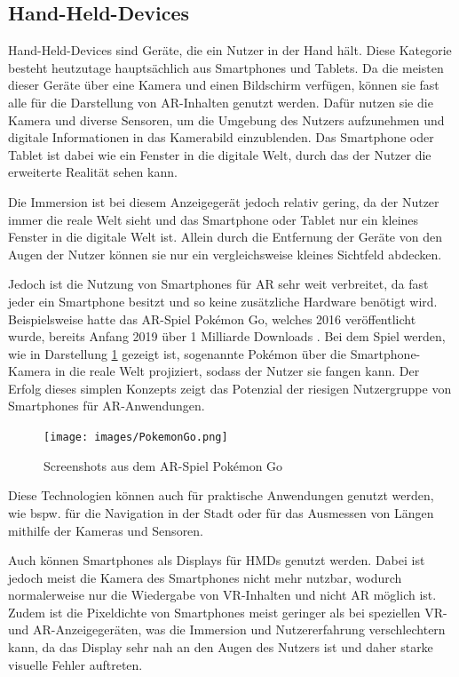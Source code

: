   \subsection{Hand-Held-Devices}

  Hand-Held-Devices sind Geräte, die ein Nutzer in der Hand hält.
  Diese Kategorie besteht heutzutage hauptsächlich aus Smartphones und Tablets.
  Da die meisten dieser Geräte über eine Kamera und einen Bildschirm verfügen, können sie fast alle für die Darstellung von AR-Inhalten genutzt werden.
  Dafür nutzen sie die Kamera und diverse Sensoren, um die Umgebung des Nutzers aufzunehmen und digitale Informationen in das Kamerabild einzublenden.
  Das Smartphone oder Tablet ist dabei wie ein Fenster in die digitale Welt, durch das der Nutzer die erweiterte Realität sehen kann.

  Die Immersion ist bei diesem Anzeigegerät jedoch relativ gering, da der Nutzer immer die reale Welt sieht und das Smartphone oder Tablet nur ein kleines Fenster in die digitale Welt ist.
  Allein durch die Entfernung der Geräte von den Augen der Nutzer können sie nur ein vergleichsweise kleines Sichtfeld abdecken.

  Jedoch ist die Nutzung von Smartphones für AR sehr weit verbreitet, da fast jeder ein Smartphone besitzt und so keine zusätzliche Hardware benötigt wird.
  Beispielsweise hatte das AR-Spiel Pok\'emon Go, welches 2016 veröffentlicht wurde, bereits Anfang 2019 über 1 Milliarde Downloads \autocite[][]{pokemon-go-stats}.
  Bei dem Spiel werden, wie in Darstellung \ref*{fig:pokemon-go} gezeigt ist, sogenannte Pok\'emon über die Smartphone-Kamera in die reale Welt projiziert, sodass der Nutzer sie fangen kann.
  Der Erfolg dieses simplen Konzepts zeigt das Potenzial der riesigen Nutzergruppe von Smartphones für AR-Anwendungen.


  \begin{figure}[H]
    \centering
    \texttt{[image: images/PokemonGo.png]}
    \caption{Screenshots aus dem AR-Spiel Pok\'emon Go}
    \label{fig:pokemon-go}
  \end{figure}

  Diese Technologien können auch für praktische Anwendungen genutzt werden, wie bspw. für die Navigation in der Stadt oder für das Ausmessen von Längen mithilfe der Kameras und Sensoren.

  Auch können Smartphones als Displays für HMDs genutzt werden.
  Dabei ist jedoch meist die Kamera des Smartphones nicht mehr nutzbar, wodurch normalerweise nur die Wiedergabe von VR-Inhalten und nicht AR möglich ist.
  Zudem ist die Pixeldichte von Smartphones meist geringer als bei speziellen VR- und AR-Anzeigegeräten, was die Immersion und Nutzererfahrung verschlechtern kann, da das Display sehr nah an den Augen des Nutzers ist und daher starke visuelle Fehler auftreten.

